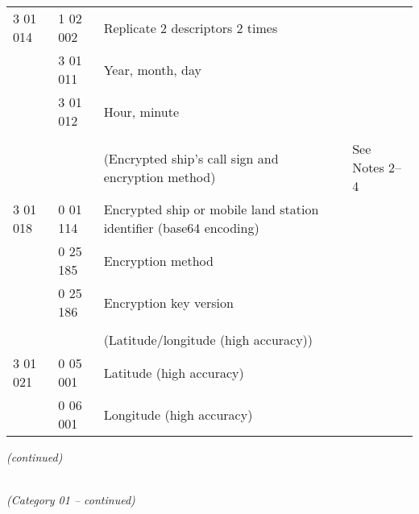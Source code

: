 \begin{longtable}[]{@{}llll@{}}
3 01 014 & 1 02 002 & Replicate 2 descriptors 2 times &\tabularnewline
& 3 01 011 & Year, month, day &\tabularnewline
& 3 01 012 & Hour, minute &\tabularnewline
& & &\tabularnewline
& & (Encrypted ship's call sign and encryption method) & See Notes 2--4\tabularnewline
3 01 018 & 0 01 114 & Encrypted ship or mobile land station identifier (base64 encoding) &\tabularnewline
& 0 25 185 & Encryption method &\tabularnewline
& 0 25 186 & Encryption key version &\tabularnewline
& & &\tabularnewline
& & (Latitude/longitude (high accuracy)) &\tabularnewline
3 01 021 & 0 05 001 & Latitude (high accuracy) &\tabularnewline
& 0 06 001 & Longitude (high accuracy) &\tabularnewline
\bottomrule
\end{longtable}

\emph{(continued)}

\emph{\\
(Category 01 -- continued)}

